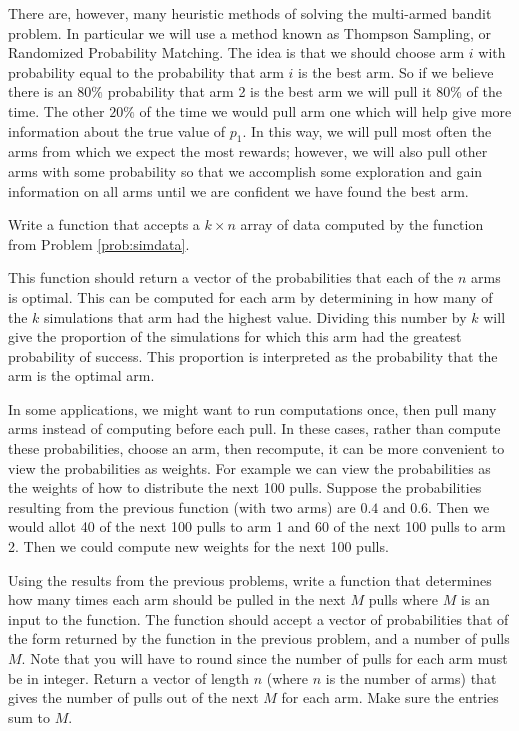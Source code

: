 There are, however, many heuristic methods of solving the multi-armed bandit problem.
In particular we will use a method known as Thompson Sampling, or Randomized Probability Matching.
The idea is that we should choose arm $i$ with probability equal to the probability 
that arm $i$ is the best arm.  So if we believe there is an $80\%$ probability that 
arm 2 is the best arm we will pull it $80\%$ of the time.  The other $20\%$ of the 
time we would pull arm one which will help give more information about the true value of $p_1$.  
In this way, we will pull most often the arms from which we expect the most rewards; 
however, we will also pull other arms with some probability so that we accomplish some 
exploration and gain information on all arms until we are confident we have found the best arm.

\begin{problem}
Write a function that accepts a $k \times n$ array of data computed by the function from Problem \ref{prob:simdata}.

This function should return a vector of the probabilities that each of the $n$ arms is optimal.  
This can be computed for each arm by determining in how many of the $k$ simulations 
that arm had the highest value.  Dividing this number by $k$ will give the proportion 
of the simulations for which this arm had the greatest probability of success.  
This proportion is interpreted as the probability that the arm is the optimal arm.
\end{problem}

In some applications, we might want to run computations once, then pull many arms instead 
of computing before each pull.  In these cases, rather than compute these probabilities, 
choose an arm, then recompute, it can be more convenient to view the probabilities as weights.  
For example we can view the probabilities as the weights of how to distribute the next 100 pulls.  
Suppose the probabilities resulting from the previous function (with two arms) are $0.4$ and $0.6$.
Then we would allot 40 of the next 100 pulls to arm 1 and 60 of the next 100 pulls to arm 2.  
Then we could compute new weights for the next 100 pulls.

\begin{problem}
Using the results from the previous problems, write a function that determines how many 
times each arm should be pulled in the next $M$ pulls where $M$ is an input to the function. 
The function should accept a vector of probabilities that of the form returned by the 
function in the previous problem, and a number of pulls $M$. 
Note that you will have to round since the number of pulls for each arm must be in integer.
Return a vector of length $n$ (where $n$ is the number of arms) that gives the number of
pulls out of the next $M$ for each arm.  Make sure the entries sum to $M$.
\end{problem}

